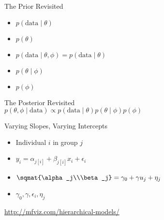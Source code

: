 \begin{frame}{The Prior Revisited}
  \Large{
    \begin{itemize}
        \item[]  $p(\text{data} \mid \theta)$
        \item[]  $p(\theta)$
      \end{itemize}\pause
    \begin{itemize}
      \item[]  $p(\text{data} \mid \theta, \phi) = p(\text{data} \mid \theta)$
      \item[]  $p(\theta \mid \phi)$
      \item[]  $p(\phi)$
    \end{itemize}
  }
\end{frame}

\begin{frame}{The Posterior Revisited}
  \Large{
    \\
    \hfill$p(\theta, \phi \mid \text{data}) \propto p(\text{data} \mid \theta) p(\theta \mid \phi) p(\phi)$\hfill
  }
\end{frame}

\begin{frame}{Varying Slopes, Varying Intercepts}
  \Large{
    \begin{itemize}
      \item[]  Individual $i$ in group $j$\pause
      \item[]  $y_i = \alpha_{j[i]} + \beta_{j[i]} x_i + \epsilon_i$\pause
      \item[]  $\sqmat{\alpha_j\\\beta_j} = \gamma_0 + \gamma u_j + \eta_j$\pause
      \item[]  $\gamma_0, \gamma, \epsilon_i, \eta_j$\pause
    \end{itemize}
  }
\end{frame}

\begin{frame}
  \centering
  \vfill
  \large \url{http://mfviz.com/hierarchical-models/}
  \vfill
\end{frame}
